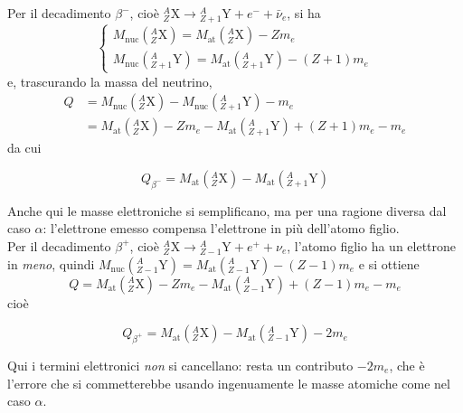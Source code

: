 Per il decadimento $\beta^-$, cioè ${}^{A}_{Z}\mathrm{X} \to {}^{A}_{Z+1}\mathrm{Y} + e^- + \bar{\nu}_e$, si ha
%
\begin{equation*}
\begin{cases}
    M_{\text{nuc}}({}^{A}_{Z}\mathrm{X}) = M_{\text{at}}({}^{A}_{Z}\mathrm{X}) - Z m_e \\[4pt]
    M_{\text{nuc}}({}^{A}_{Z+1}\mathrm{Y}) = M_{\text{at}}({}^{A}_{Z+1}\mathrm{Y}) - (Z+1) m_e
\end{cases}
\end{equation*}
e, trascurando la massa del neutrino,
%
\begin{equation}
\begin{aligned}
    Q & = M_{\text{nuc}}({}^{A}_{Z}\mathrm{X}) - M_{\text{nuc}}({}^{A}_{Z+1}\mathrm{Y}) - m_e \\[4pt]
      & = M_{\text{at}}({}^{A}_{Z}\mathrm{X}) - Z m_e - M_{\text{at}}({}^{A}_{Z+1}\mathrm{Y}) + (Z+1) m_e - m_e
\end{aligned}
\end{equation}
da cui
%
\begin{tcolorbox}[colback=black!5!white, colframe=black!45!white, boxrule=0.8pt]
\begin{equation}
    Q_{\beta^-} = M_{\text{at}}({}^{A}_{Z}\mathrm{X}) - M_{\text{at}}({}^{A}_{Z+1}\mathrm{Y}) 
\end{equation}
\end{tcolorbox}
Anche qui le masse elettroniche si semplificano, ma per una ragione diversa dal caso $\alpha$: l'elettrone emesso compensa l'elettrone in più dell'atomo figlio.\\

Per il decadimento $\beta^+$, cioè ${}^{A}_{Z}\mathrm{X} \to {}^{A}_{Z-1}\mathrm{Y} + e^+ + \nu_e$, l'atomo figlio ha un elettrone in \emph{meno}, quindi $M_{\text{nuc}}({}^{A}_{Z-1}\mathrm{Y}) = M_{\text{at}}({}^{A}_{Z-1}\mathrm{Y}) - (Z-1) m_e$ e si ottiene
%
\begin{equation}
    Q = M_{\text{at}}({}^{A}_{Z}\mathrm{X}) - Z m_e - M_{\text{at}}({}^{A}_{Z-1}\mathrm{Y}) + (Z-1) m_e - m_e
\end{equation}
cioè
%
\begin{tcolorbox}[colback=black!5!white, colframe=black!45!white, boxrule=0.8pt]
\begin{equation}
    Q_{\beta^+} = M_{\text{at}}({}^{A}_{Z}\mathrm{X}) - M_{\text{at}}({}^{A}_{Z-1}\mathrm{Y}) - 2 m_e
\end{equation}
\end{tcolorbox}
Qui i termini elettronici \emph{non} si cancellano: resta un contributo $-2m_e$, che è l'errore che si commetterebbe usando ingenuamente le masse atomiche come nel caso $\alpha$.\\

